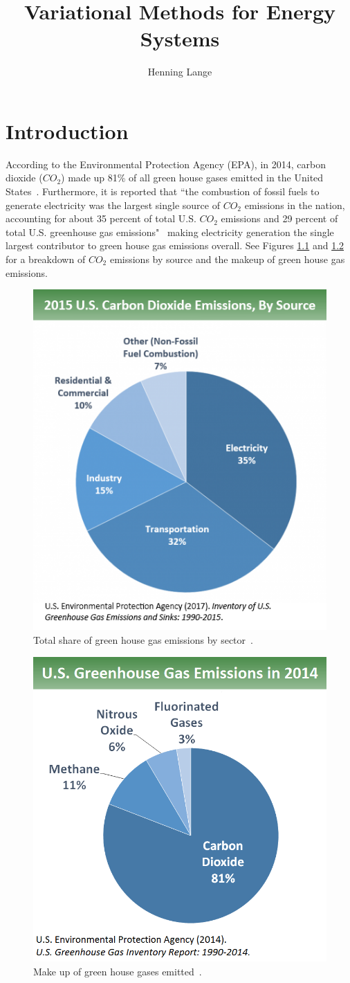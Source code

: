 \documentclass[11pt]{cmuthesis} %
\title{Variational Methods for Energy Systems}
\author{Henning Lange}
\begin{document}





\chapter{Introduction}

According to the Environmental Protection Agency (EPA), in 2014, carbon dioxide ($CO_2$) made up 81\% of all green house gases emitted in the United States~\cite{EPA}. Furthermore, it is reported that ``the combustion of fossil fuels to generate electricity was the largest single source of $CO_2$ emissions in the nation, accounting for about 35 percent of total U.S. $CO_2$ emissions and 29 percent of total U.S. greenhouse gas emissions"~\cite{EPA} making electricity generation the single largest contributor to green house gas emissions overall. See Figures \ref{fig:intro} and \ref{fig:intro2} for a breakdown of $CO_2$ emissions by source and the makeup of green house gas emissions.
\begin{figure}
\centering
\includegraphics[width=0.45\linewidth]{co2b.png}
\caption[Total share of green house gas emissions by sector.]{Total share of green house gas emissions by sector~\cite{EPA}.}
\label{fig:intro}
\end{figure}

\begin{figure}
    \centering
    \includegraphics[width=0.50\linewidth]{ghgs.png}
    \caption[Make up of green house gases emitted]{Make up of green house gases emitted~\cite{EPA}.}
    \label{fig:intro2}
\end{figure}
\end{document}
